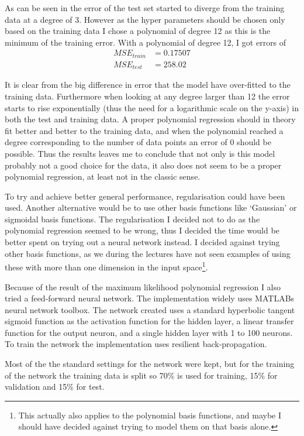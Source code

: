 \documentclass[a4paper, 11pt]{article}
\begin{document}
As can be seen in  the error of the test set started to diverge from the training data at a degree of 3. However as the hyper parameters should be chosen only based on the training data I chose a polynomial of degree 12 as this is the minimum of the training error. With a polynomial of degree 12, I got errors of
\begin{align*}
    MSE_{\mathit{train}} &= 0.17507 \\
    MSE_{\mathit{test}} &= 258.02
\end{align*}

It is clear from the big difference in error that the model have over-fitted to the training data. Furthermore when looking at any degree larger than 12 the error starts to rise exponentially (thus the need for a logarithmic scale on the y-axis) in both the test and training data. A proper polynomial regression should in theory fit better and better to the training data, and when the polynomial reached a degree corresponding to the number of data points an error of 0 should be possible. Thus the results leaves me to conclude that not only  is this model probably not a good choice for the data, it also does not seem to be a proper polynomial regression, at least not in the classic sense.

To try and achieve better general performance, regularisation could have been used. Another alternative would be to use other basis functions like `Gaussian' or sigmoidal basis functions. The regularisation I decided not to do as the polynomial regression seemed to be wrong, thus I decided the time would be better spent on trying out a neural network instead. I decided against trying other basis functions, as we during the lectures have not seen examples of using these with more than one dimension in the input space\footnote{This actually also applies to the polynomial basis functions, and maybe I should have decided against trying to model them on that basis alone.}.

Because of the result of the maximum likelihood polynomial regression I also tried a feed-forward neural network. The implementation widely uses MATLABs neural network toolbox. The network created uses a standard hyperbolic tangent sigmoid function as the activation function for the hidden layer, a linear transfer function for the output neuron, and a single hidden layer with 1 to 100 neurons. To train the network the implementation uses resilient back-propagation.

Most of the the standard settings for the network were kept, but for the training of the network the training data is split so 70\% is used for training, 15\% for validation and 15\% for test.
\end{document}
